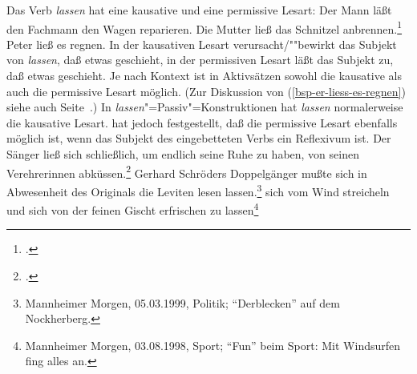 Das Verb \emph{lassen} hat eine kausative
und eine permissive Lesart:
\eal
\ex Der Mann läßt den Fachmann den Wagen reparieren.
\ex Die Mutter ließ das Schnitzel anbrennen.\label{bsp-schnitzel-anbrennen}\footnote{
        .%
      }
\ex Peter ließ es regnen.\label{bsp-er-liess-es-regnen}
\zl
In der kausativen Lesart verursacht/""bewirkt das Subjekt von \emph{lassen},
daß etwas geschieht, in der permissiven Lesart läßt das Subjekt zu, daß
etwas geschieht. Je nach Kontext ist in Aktivsätzen sowohl die kausative
als auch die permissive Lesart möglich.
(Zur Diskussion von (\ref{bsp-er-liess-es-regnen})
siehe auch Seite~\pageref{bsp-er-laesst-es-regnen}.)
%
In \emph{lassen}"=Passiv"=Konstruktionen hat \emph{lassen} normalerweise die 
kausative Lesart.
\citet[]{Reis76c} hat jedoch festgestellt, daß die
permissive Lesart ebenfalls möglich ist,
wenn das Subjekt des eingebetteten Verbs ein Reflexivum ist.
\eal
\label{bsp-lassen-passiv-permissiv}
\ex 
Der Sänger ließ sich schließlich, um endlich seine Ruhe zu haben, von seinen Verehrerinnen abküssen.\footnote{
        .%
}
\ex{}
Gerhard Schröders Doppelgänger mußte sich in Abwesenheit des Originals die Leviten lesen lassen.\footnote{
Mannheimer Morgen, 05.03.1999, Politik; "`Derblecken"' auf dem Nockherberg.%
}
\label{ex-leviten-lassen}
\ex 
sich vom Wind streicheln und sich von der feinen Gischt erfrischen zu lassen\label{ex-sich-vom-wind-streicheln-lassen}\footnote{
Mannheimer Morgen, 03.08.1998, Sport; "`Fun"' beim Sport: Mit Windsurfen fing alles an.%
}
\zl
%

